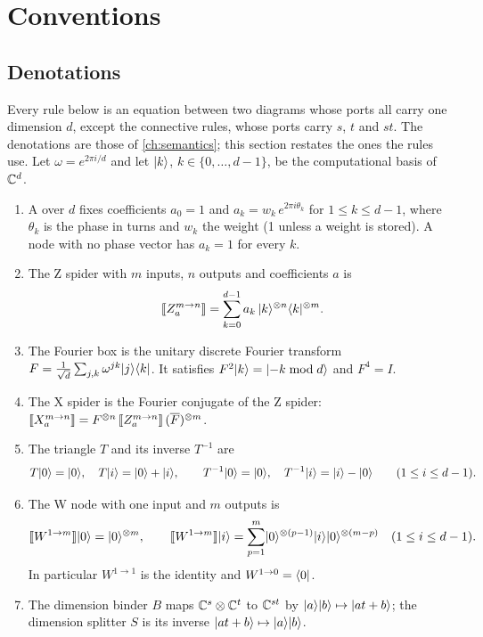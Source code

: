 \section{Conventions}\label{sec:rules-conventions}

\subsection{Denotations}\label{sec:rules-denotations}

Every rule below is an equation between two diagrams whose ports all carry one dimension $d$, except the connective rules, whose ports carry $s$, $t$ and $st$. The denotations are those of \cref{ch:semantics}; this section restates the ones the rules use. Let $\omega=e^{2\pi i/d}$ and let $\lvert k \rangle$, $k\in\{0,\dots,d-1\}$, be the computational basis of $\mathbb{C}^d$.

\begin{definition}\label{def:rules-denotations}
\leavevmode
\begin{enumerate}
\item A  over $d$ fixes coefficients $a_0=1$ and $a_k=w_k\,e^{2\pi i\theta_k}$ for $1\le k\le d-1$, where $\theta_k$ is the phase in turns and $w_k$ the weight (1 unless a weight is stored). A node with no phase vector has $a_k=1$ for every $k$.
\item The Z spider with $m$ inputs, $n$ outputs and coefficients $a$ is
\[\llbracket Z^{m\to n}_a \rrbracket=\sum_{k=0}^{d-1}a_k\,\lvert k \rangle^{\otimes n}\langle k \rvert^{\otimes m}.\]
\item The Fourier box is the unitary discrete Fourier transform $F=\frac{1}{\sqrt d}\sum_{j,k}\omega^{jk}\lvert j \rangle\langle k \rvert$. It satisfies $F^2\lvert k \rangle=\lvert -k \bmod d \rangle$ and $F^4=I$.
\item The X spider is the Fourier conjugate of the Z spider: $\llbracket X^{m\to n}_a \rrbracket=F^{\otimes n}\,\llbracket Z^{m\to n}_a \rrbracket\,(\overline{F})^{\otimes m}$.
\item The triangle $T$ and its inverse $T^{-1}$ are
\[T\lvert 0 \rangle=\lvert 0 \rangle,\quad T\lvert i \rangle=\lvert 0 \rangle+\lvert i \rangle,\qquad T^{-1}\lvert 0 \rangle=\lvert 0 \rangle,\quad T^{-1}\lvert i \rangle=\lvert i \rangle-\lvert 0 \rangle\qquad(1\le i\le d-1).\]
\item The W node with one input and $m$ outputs is
\[\llbracket W^{1\to m} \rrbracket\lvert 0 \rangle=\lvert 0 \rangle^{\otimes m},\qquad \llbracket W^{1\to m} \rrbracket\lvert i \rangle=\sum_{p=1}^{m}\lvert 0 \rangle^{\otimes(p-1)}\lvert i \rangle\lvert 0 \rangle^{\otimes(m-p)}\quad(1\le i\le d-1).\]
In particular $W^{1\to 1}$ is the identity and $W^{1\to 0}=\langle 0 \rvert$.
\item The dimension binder $B$ maps $\mathbb{C}^s\otimes\mathbb{C}^t$ to $\mathbb{C}^{st}$ by $\lvert a \rangle\lvert b \rangle\mapsto\lvert at+b \rangle$; the dimension splitter $S$ is its inverse $\lvert at+b \rangle\mapsto\lvert a \rangle\lvert b \rangle$.
\end{enumerate}
\end{definition}

